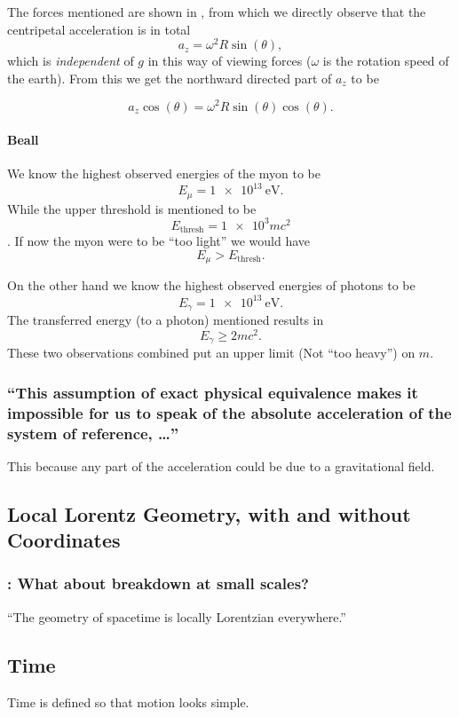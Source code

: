 The forces mentioned are shown in , from which we directly observe that the centripetal acceleration is in total
\[a_z=\omega^2 R \sin(\theta),\]
which is \emph{independent} of $g$ in this way of viewing forces ($\omega$ is the rotation speed of the earth).
From this we get the northward directed part of $a_z$  to be 

\[a_z \cos(\theta)=\omega^2 R \sin(\theta)\cos(\theta).\]

\paragraph{Beall }
We know the highest observed energies of the myon to be \[E_\mu = \SI{1e13}{\electronvolt}.\]
While the upper threshold is mentioned to be \[E_{\text{thresh}}=\num{1e3} m c^2\].
If now the myon were to be \enquote{too light} we would have \[E_\mu>E_{\text{thresh}}.\]

On the other hand we know the highest observed energies of photons to be \[E_\gamma=\SI{1e13}{\electronvolt}.\]
The transferred energy (to a photon) mentioned results in \[E_\gamma\geq 2 m c^2.\] These two observations combined put an upper limit (Not \enquote{too heavy}) on $m$.

\subsubsection{\enquote{This assumption of exact physical equivalence makes it impossible for us to speak of the absolute acceleration of the system of reference, \dots} }
This because any part of the acceleration could be due to a gravitational field.


\subsection{Local Lorentz Geometry, with and without Coordinates}\label{susec:1_4}
\subsubsection{\hint: What about breakdown at small scales? }
\enquote{The geometry of spacetime is locally Lorentzian everywhere.}

\subsection{Time}\label{susec:1_5}
Time is defined so that motion looks simple.


